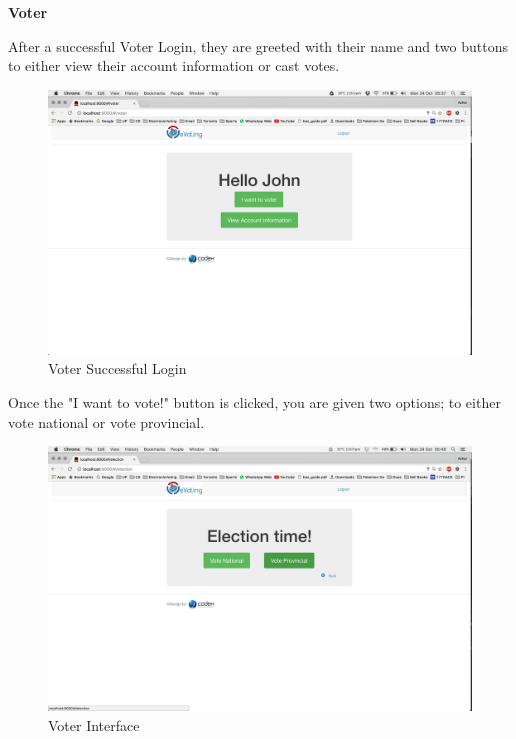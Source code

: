 \documentclass[11pt]{article}
\begin{document}
		\textbf{Voter} \newline
		
		After a successful Voter Login, they are greeted with their name and two buttons to either view their account information or cast votes. 
		\begin{figure}[H]
			\centering
			\includegraphics[width=0.7\linewidth]{../Images/UserManual/voterWeb/votersuccesslogin.png}
			\caption{Voter  Successful Login}
		\end{figure}
		\newpage
		Once the "I want to vote!" button is clicked, you are given two options; to either vote national or vote provincial. 
		\begin{figure}[H]
			\centering
			\includegraphics[width=0.7\linewidth]{../Images/UserManual/voterWeb/voterbuttons.png}
			\caption{Voter  Interface}
		\end{figure}
		
\end{document}
